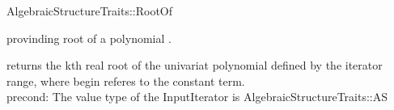 \begin{ccRefConcept}{AlgebraicStructureTraits::RootOf}

\begin{ccAdvanced}
\ccDefinition

 provinding root of a polynomial . 
\ccRefines 


\ccTypes
{}

\ccOperations
{}
{returns the kth real root of the univariat polynomial defined by the iterator range, 
 where begin referes to the constant term. \\
 precond: The value type of the InputIterator is AlgebraicStructureTraits::AS\\ }



\ccSeeAlso


\end{ccAdvanced}
\end{ccRefConcept} 